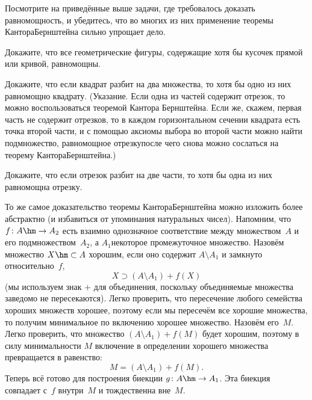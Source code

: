 \begin{problem}
Посмотрите на приведённые выше задачи, где требовалось
доказать равномощность, и убедитесь, что во многих из
них применение теоремы Кантора\ч Бернштейна сильно
упрощает дело.
\end{problem}

\begin{problem}
Докажите, что все геометрические фигуры, содержащие хотя бы
кусочек прямой или кривой, равномощны.
\end{problem}

\begin{problem}\label{split-continuum-1}
Докажите, что если квадрат разбит на два множества, то хотя бы
одно из них равномощно квадрату. (Указание. Если одна из частей
содержит отрезок, то можно воспользоваться теоремой Кантора\ч
Бернштейна. Если же, скажем, первая часть не содержит отрезков,
то в каждом горизонтальном сечении квадрата есть точка второй
части, и с помощью аксиомы выбора во второй части можно найти
подмножество, равномощное отрезку\т после чего снова можно
сослаться на теорему Кантора\ч Бернштейна.)
\end{problem}

\begin{problem}\label{split-continuum-2}
Докажите, что если отрезок разбит на две части, то
хотя бы одна из них равномощна отрезку.
\end{problem}

То же самое доказательство теоремы Кантора\ч Бернштейна можно
изложить более абстрактно (и избавиться от упоминания
натуральных чисел). Напомним, что $f\colon A\hm\to A_2$ есть
взаимно однозначное соответствие между множеством~$A$ и его
подмножеством~$A_2$, а $A_1$\т некоторое промежуточное
множество. Назовём множество $X\hm\subset A$  хорошим,
если оно содержит $A\setminus A_1$ и замкнуто относительно~$f$,
        $$
X \supset (A\setminus A_1) + f(X)
        $$
(мы используем знак $+$ для объединения, поскольку объединяемые
множества заведомо не пересекаются). Легко проверить, что
пересечение любого семейства хороших множеств хорошее, поэтому
если мы пересечём все хорошие множества, то получим минимальное
по включению хорошее множество. Назовём его~$M$. Легко
проверить, что множество $(A\setminus A_1)+f(M)$ будет хорошим,
поэтому в силу минимальности $M$ включение в определении
хорошего множества превращается в равенство:
        $$
M = (A\setminus A_1) + f(M).
        $$
Теперь всё готово для построения биекции $g\colon A\hm\to A_1$.
Эта биекция совпадает с~$f$ внутри~$M$ и тождественна вне~$M$.


